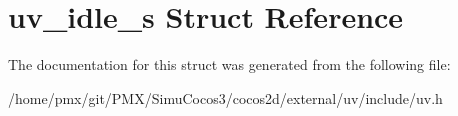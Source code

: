 \hypertarget{structuv__idle__s}{}\section{uv\+\_\+idle\+\_\+s Struct Reference}
\label{structuv__idle__s}


The documentation for this struct was generated from the following file\+:\begin{DoxyCompactItemize}
\item 
/home/pmx/git/\+P\+M\+X/\+Simu\+Cocos3/cocos2d/external/uv/include/uv.\+h\end{DoxyCompactItemize}
